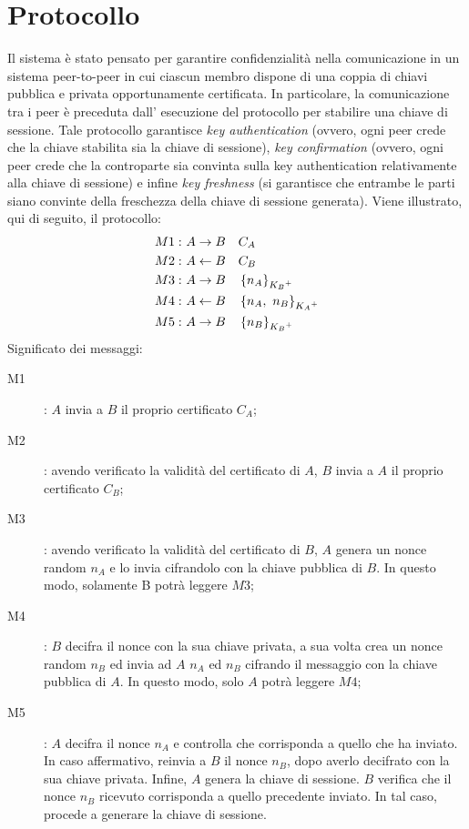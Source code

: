 \chapter{Protocollo}
	Il sistema è stato pensato per garantire confidenzialità nella comunicazione in un sistema 
	peer-to-peer in cui ciascun membro dispone di una coppia di chiavi pubblica e privata 
	opportunamente certificata. In particolare, la comunicazione tra i peer è preceduta dall' 
	esecuzione del protocollo per stabilire una chiave di sessione. Tale protocollo garantisce 
	\emph{key authentication} (ovvero, ogni peer crede che la chiave stabilita sia la chiave
	di sessione), \emph{key confirmation} (ovvero, ogni peer crede che la controparte sia
	convinta sulla key authentication relativamente alla chiave di sessione) e infine
	\emph{key freshness} (si garantisce che entrambe le parti siano convinte della freschezza
	della chiave di sessione generata).
	Viene illustrato, qui di seguito, il protocollo:
	\[
		\begin{aligned}
			M1:\ & A \rightarrow B & & C_A\\
			M2:\ & A \leftarrow B & & C_B\\
			M3:\ & A \rightarrow B & & \encrypt{n_A}{\publickey{B}}\\
			M4:\ & A \leftarrow B & & \encrypt{n_A,\ n_B}{\publickey{A}}\\
			M5:\ & A \rightarrow B & & \encrypt{n_B}{\publickey{B}}\\
		\end{aligned}
	\]
	Significato dei messaggi:
	\begin{description}
		\item[M1]: $A$ invia a $B$ il proprio certificato $C_A$;
		\item[M2]: avendo verificato la validità del certificato di $A$, $B$ invia a $A$ il proprio certificato $C_B$;
		\item[M3]: avendo verificato la validità del certificato di $B$, $A$ genera un nonce random $n_A$ e lo invia
		cifrandolo con la chiave pubblica di $B$. In questo modo, solamente B potrà leggere $M3$;
		\item[M4]: $B$ decifra il nonce con la sua chiave privata, a sua volta crea un nonce random $n_B$ ed invia
		ad $A$ $n_A$ ed $n_B$ cifrando il messaggio con la chiave pubblica di $A$. In questo modo, solo $A$ potrà 
		leggere $M4$;
		\item[M5]: $A$ decifra il nonce $n_A$ e controlla che corrisponda a quello che ha inviato. In caso affermativo,
		reinvia a $B$ il nonce $n_B$, dopo averlo decifrato con la sua chiave privata. Infine, $A$ genera la chiave di sessione.
		$B$ verifica che il nonce $n_B$ ricevuto corrisponda a quello precedente inviato. In tal caso, procede a generare la chiave di sessione.
	\end{description}


